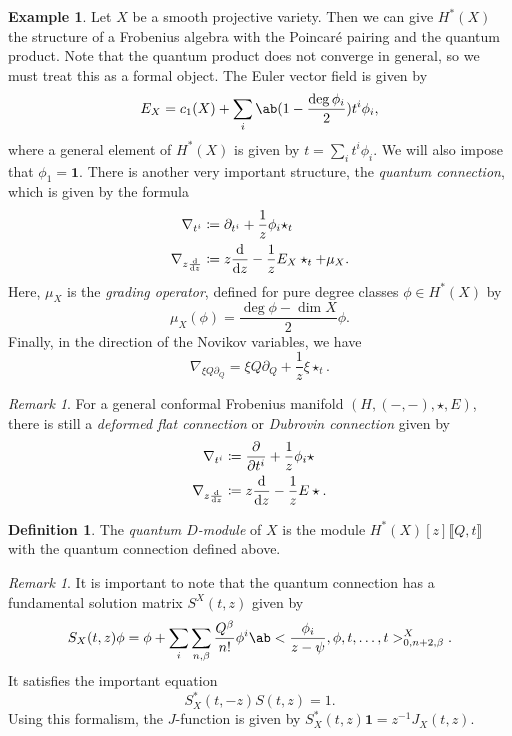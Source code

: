 \documentclass[leqno, openany]{memoir}
\theoremstyle{definition}
\newtheorem{defn}[thm]{Definition}
\newtheorem{exm}[thm]{Example}
\theoremstyle{remark}
\newtheorem{rmk}[thm]{Remark}
\theoremstyle{plain}
\theoremstyle{definition}
\theoremstyle{remark}
\newcommand{\mbf}[1]{\mathbf{#1}}
\begin{document}
\begin{exm}
    Let $X$ be a smooth projective variety. Then we can give $H^*(X)$ the structure of a Frobenius algebra with the Poincar\'e pairing and the quantum product. Note that the quantum product does not converge in general, so we must treat this as a formal object. The Euler vector field is given by
    \[ E_X = c_1(X) + \sum_i \ab(1-\frac{\deg \phi_i}{2})t^i \phi_i, \]
    where a general element of $H^*(X)$ is given by $t = \sum_i t^i \phi_i$. We will also impose that $\phi_1 = \mbf{1}$. There is another very important structure, the \textit{quantum connection}, which is given by the formula
    \begin{align*}
        \nabla_{t^i} &\coloneqq \partial_{t^i} + \frac{1}{z} \phi_i \star_t \\
        \nabla_{z \odv{}{z}} &\coloneqq z \odv{}{z} - \frac{1}{z} E_X \star_t + \mu_X.
    \end{align*}
    Here, $\mu_X$ is the \textit{grading operator}, defined for pure degree classes $\phi \in H^*(X)$ by
    \[ \mu_X(\phi) = \frac{\deg \phi - \dim X}{2} \phi. \]
    Finally, in the direction of the Novikov variables, we have
    \[ \nabla_{\xi Q \partial_Q} = \xi Q \partial_Q + \frac{1}{z} \xi \star_t. \]
\end{exm}

\begin{rmk}
    For a general conformal Frobenius manifold $(H, (-,-), \star, E)$, there is still a \textit{deformed flat connection} or \textit{Dubrovin connection} given by
    \begin{align*}
        \nabla_{t^i} &\coloneqq \pdv{}{t^i} + \frac{1}{z} \phi_i \star \\
        \nabla_{z \odv{}{z}} &\coloneqq z \odv{}{z} - \frac{1}{z} E \star.
    \end{align*}
\end{rmk}


\begin{defn}
    The \textit{quantum $D$-module} of $X$ is the module $H^*(X)[z]\llbracket Q,t\rrbracket$ with the quantum connection defined above.
\end{defn}

\begin{rmk}
    It is important to note that the quantum connection has a fundamental solution matrix $S^X(t,z)$ given by
    \[ S_X(t,z) \phi = \phi + \sum_{i} \sum_{n,\beta} \frac{Q^{\beta}}{n!} \phi^i \ab<\frac{\phi_i}{z-\psi},\phi,t,\ldots,t>_{0,n+2,\beta}^X. \]
    It satisfies the important equation
    \[ S_X^*(t,-z) S(t,z) = 1. \]
    Using this formalism, the $J$-function is given by $S_X^*(t,z) \mbf{1} = z^{-1} J_X(t,z)$.
\end{rmk}
\end{document}
